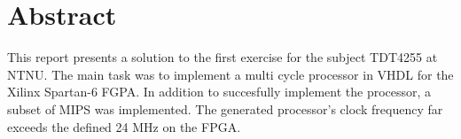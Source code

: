 \section*{Abstract}
\label{sec:abstract}

\vspace*{\fill}
This report presents a solution to the first exercise for the subject TDT4255 at NTNU.
The main task was to implement a multi cycle processor in VHDL for the Xilinx Spartan-6 FGPA.
In addition to succesfully implement the processor, a subset of MIPS was implemented.
The generated processor's clock frequency far exceeds the defined 24 MHz on the FPGA.
\vspace*{\fill}
